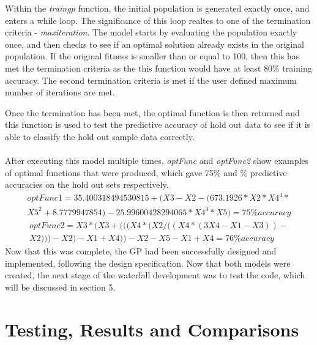 \documentclass[11pt]{article}
\begin{document}
Within the \textit{train\textunderscore gp} function, the initial population is generated exactly once, and enters a while loop. The significance of this loop realtes to one of the termination criteria - \textit{max\textunderscore iteration}. The model starts by evaluating the population exactly once, and then checks to see if an optimal solution already exists in the original population. If the original fitness is smaller than or equal to 100, then this has met the termination criteria as the this function would have at least 80\% training accuracy. The second termination criteria is met if the user defined maximum number of iterations are met. 

Once the termination has been met, the optimal function is then returned and this function is used to test the predictive accuracy of hold out data to see if it is able to classify the hold out sample data correctly. \\\\
After executing this model multiple times, \textit{optFunc} and \textit{optFunc2} show examples of optimal functions that were produced, which gave 75\% and \% predictive accuracies on the hold out sets respectively. 
\begin{align*}
optFunc1=  35.400318494530815+(X3-X2-(673.1926*X2*X4^4*\\
X5^2+8.7779947854)-25.99600428294065*X4^3*X5) = 75\%  accuracy
\end{align*}
\begin{align*}
optFunc2 = X3*(X3+(((X4*(X2/((X4*(3X4-X1-X3))-\\
X2)))-X2)-X1+X4))-X2-X5-X1+X4 = 76\%  accuracy
\end{align*}
Now that this was complete, the GP had been successfully designed and implemented, following the design specification. Now that both models were created, the next stage of the waterfall development was to test the code, which will be discussed in section 5. 
\section{Testing, Results and Comparisons} %
\end{document}
